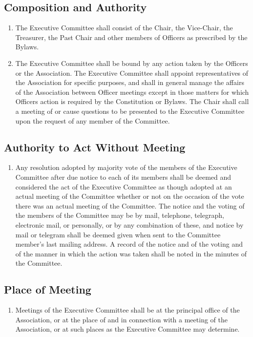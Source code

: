 \subsection{Composition and Authority}
\begin{enumerate}
	\item The Executive Committee shall consist of the Chair, the Vice-Chair, the Treasurer, the Past Chair and other members of Officers as prescribed by the Bylaws.
	\item The Executive Committee shall be bound by any action taken by the Officers or the Association. The Executive Committee shall appoint representatives of the Association for specific purposes, and shall in general manage the affairs of the Association between Officer meetings except in those matters for which Officers action is required by the Constitution or Bylaws. The Chair shall call a meeting of or cause questions to be presented to the Executive Committee upon the request of any member of the Committee.
\end{enumerate}

\subsection{Authority to Act Without Meeting}
\begin{enumerate}
	\item Any resolution adopted by majority vote of the members of the Executive Committee after due notice to each of its members shall be deemed and considered the act of the Executive Committee as though adopted at an actual meeting of the Committee whether or not on the occasion of the vote there was an actual meeting of the Committee. The notice and the voting of the members of the Committee may be by mail, telephone, telegraph, electronic mail, or personally, or by any combination of these, and notice by mail or telegram shall be deemed given when sent to the Committee member's last mailing address. A record of the notice and of the voting and of the manner in which the action was taken shall be noted in the minutes of the Committee.
\end{enumerate}

\subsection{Place of Meeting}
\begin{enumerate}
	\item Meetings of the Executive Committee shall be at the principal office of the Association, or at the place of and in connection with a meeting of the Association, or at such places as the Executive Committee may determine.
\end{enumerate}

